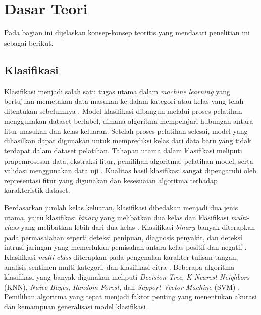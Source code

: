 \section{Dasar Teori} \label{II.Teori}
Pada bagian ini dijelaskan konsep-konsep teoritis yang mendasari penelitian ini sebagai berikut. \par

\subsection{Klasifikasi} \label{II.klasifikasi}
Klasifikasi menjadi salah satu tugas utama dalam \textit{machine learning} yang bertujuan memetakan data masukan ke dalam kategori atau kelas yang telah ditentukan sebelumnya \cite{Sarker2021ML}. Model klasifikasi dibangun melalui proses pelatihan menggunakan dataset berlabel, dimana algoritma mempelajari hubungan antara fitur masukan dan kelas keluaran. Setelah proses pelatihan selesai, model yang dihasilkan dapat digunakan untuk memprediksi kelas dari data baru yang tidak terdapat dalam dataset pelatihan. Tahapan utama dalam klasifikasi meliputi prapemrosesan data, ekstraksi fitur, pemilihan algoritma, pelatihan model, serta validasi menggunakan data uji \cite{Sarker2021ML, Mohammed2020Resampling}. Kualitas hasil klasifikasi sangat dipengaruhi oleh representasi fitur yang digunakan dan kesesuaian algoritma terhadap karakteristik dataset.

Berdasarkan jumlah kelas keluaran, klasifikasi dibedakan menjadi dua jenis utama, yaitu klasifikasi \textit{binary} yang melibatkan dua kelas dan klasifikasi \textit{multi-class} yang melibatkan lebih dari dua kelas \cite{Sarker2021ML}. Klasifikasi \textit{binary} banyak diterapkan pada permasalahan seperti deteksi penipuan, diagnosis penyakit, dan deteksi intrusi jaringan yang memerlukan pemisahan antara kelas positif dan negatif \cite{He2009Imbalanced}. Klasifikasi \textit{multi-class} diterapkan pada pengenalan karakter tulisan tangan, analisis sentimen multi-kategori, dan klasifikasi citra \cite{Abdullah2021SVM}. Beberapa algoritma klasifikasi yang banyak digunakan meliputi \textit{Decision Tree}, \textit{K-Nearest Neighbors} (KNN), \textit{Naive Bayes}, \textit{Random Forest}, dan \textit{Support Vector Machine} (SVM) \cite{Cervantes2020SVM}. Pemilihan algoritma yang tepat menjadi faktor penting yang menentukan akurasi dan kemampuan generalisasi model klasifikasi \cite{Abdullah2021SVM}.


